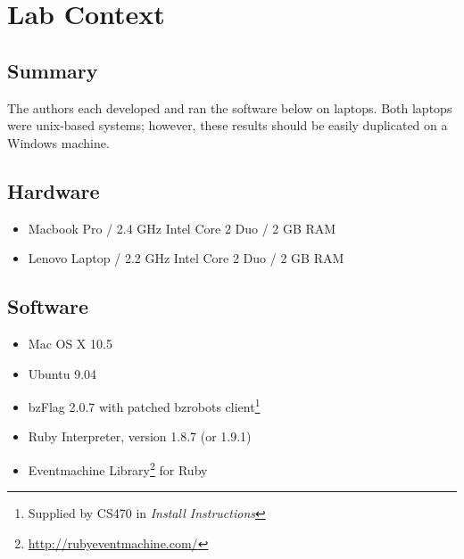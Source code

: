 \chapter{Lab Context}\label{chap:context}
\section{Summary}
The authors each developed and ran the software below on laptops.  Both laptops were unix-based systems; however, these results should be easily duplicated on a Windows machine.

\section{Hardware}
\begin{itemize}
    \item Macbook Pro / 2.4 GHz Intel Core 2 Duo / 2 GB RAM
    \item Lenovo Laptop / 2.2 GHz Intel Core 2 Duo / 2 GB RAM
\end{itemize}

\section{Software}
\begin{itemize}
    \item Mac OS X 10.5
    \item Ubuntu 9.04
    \item bzFlag 2.0.7 with patched bzrobots client\footnote{Supplied by CS470 in \textsl{Install Instructions}}
    \item Ruby Interpreter, version 1.8.7 (or 1.9.1)
    \item Eventmachine Library\footnote{\url{http://rubyeventmachine.com/}} for Ruby
\end{itemize}
